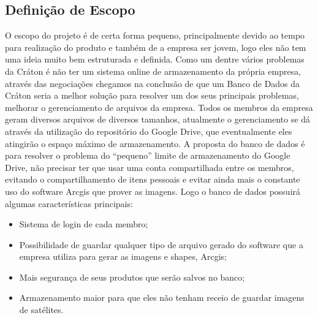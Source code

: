   \subsection{Definição de Escopo}
  O escopo do projeto é de certa forma pequeno, principalmente devido ao tempo para realização do produto e também de a empresa ser jovem, logo eles não tem uma ideia muito bem estruturada e definida. Como um dentre vários problemas da Cráton é não ter um sistema online de armazenamento da própria empresa, através das negociações chegamos na conclusão de que um Banco de Dados da Cráton seria a melhor solução para resolver um dos seus principais problemas, melhorar o gerenciamento de arquivos da empresa.
Todos os membros da empresa geram diversos arquivos de diversos tamanhos, atualmente o gerenciamento se dá através da utilização do repositório do Google Drive, que eventualmente eles atingirão o espaço máximo de armazenamento.
A proposta do banco de dados é para resolver o problema do “pequeno” limite de armazenamento do Google Drive, não precisar ter que usar uma conta compartilhada entre os membros, evitando o compartilhamento de itens pessoais e evitar ainda mais o constante uso do software Arcgis que prover as imagens. Logo o banco de dados possuirá algumas características principais:
\begin{itemize}
\item{Sistema de login de cada membro;}
\item{Possibilidade de guardar qualquer tipo de arquivo gerado do software que a empresa utiliza para gerar as imagens e shapes, Arcgis;}
\item{Mais segurança de seus produtos que serão salvos no banco;}
\item{Armazenamento maior para que eles não tenham receio de guardar imagens de satélites.}
\end{itemize}